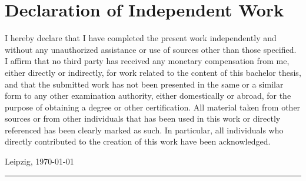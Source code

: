 
\clearpage
\thispagestyle{empty}

\section*{Declaration of Independent Work}

I hereby declare that I have completed the present work independently and without any unauthorized assistance or use of sources other than those specified. I affirm that no third party has received any monetary compensation from me, either directly or indirectly, for work related to the content of this bachelor thesis, and that the submitted work has not been presented in the same or a similar form to any other examination authority, either domestically or abroad, for the purpose of obtaining a degree or other certification. All material taken from other sources or from other individuals that has been used in this work or directly referenced has been clearly marked as such. In particular, all individuals who directly contributed to the creation of this work have been acknowledged.

\vspace{4\baselineskip}

\begin{center}
\begin{minipage}[t]{0.48\textwidth}
Leipzig, \today
\end{minipage} %
\begin{minipage}[t]{0.48\textwidth}
\vspace{0.1\baselineskip}
\rule{12em}{0.5pt} \\
\tAuthor
\end{minipage}
\end{center}
